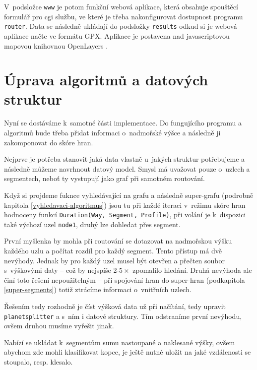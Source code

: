 \documentclass[thesis=B,czech]{FITthesis}[2012/06/26]
\begin{document}
V~podsložce \verb|www| je potom funkční webová aplikace, která obsahuje spouštěcí formulář pro cgi službu, ve které je třeba nakonfigurovat dostupnost programu \verb|router|. Data se následně ukládají do podsložky \verb|results| odkud si je webová aplikace načte ve formátu GPX. Aplikace je postavena nad javascriptovou mapovou knihovnou OpenLayers \cite{openlayers}.



\section{Úprava algoritmů a datových struktur}
\label{uprava-algoritmu}
Nyní se dostáváme k~samotné části implementace. Do fungujícího programu a algoritmů bude třeba přidat informaci o~nadmořské výšce a následně ji zakomponovat do skóre hran.

Nejprve je potřeba stanovit jaká data vlastně u~jakých struktur potřebujeme a následně můžeme navrhnout datový model. Smysl má uvažovat pouze o~uzlech a segmentech, neboť ty vystupují jako graf při samotném routování.

Když si projdeme fuknce vyhledávající na grafu a následně super-grafu (podrobně kapitola \ref{vyhledavaci-algoritmus}) jsou tu při každé iteraci  v~režimu  skóre hran hodnoceny funkcí \verb|Duration(Way, Segment, Profile)|, při volání je k~dispozici také výchozí uzel \verb|node1|, druhý lze dohledat přes segment.

První myšlenka by mohla při routování se dotazovat na nadmořskou výšku každého uzlu a počítat rozdíl pro každý segment. Tento přístup má dvě nevýhody. Jednak by pro každý uzel musel být otevřen a přečten soubor s~výškovými daty -- což by nejspíše 2-$5\times$ zpomalilo hledání. Druhá nevýhoda ale činí toto řešení nepoužitelným -- při spojování hran do super-hran (podkapitola \ref{super-segments}) totiž ztrácíme informaci o~vnitřních uzlech.

Řešením tedy rozhodně je číst výšková data už při načítání, tedy upravit \verb|planetsplitter| a s~ním i datové struktury. Tím odstraníme první nevýhodu, ovšem druhou musíme vyřešit jinak. 

Nabízí se ukládat k~segmentům sumu nastoupané a naklesané výšky, ovšem abychom zde mohli klasifikovat kopce, je ještě nutné uložit na jaké vzdálenosti se stoupalo, resp. klesalo. 
\end{document}
